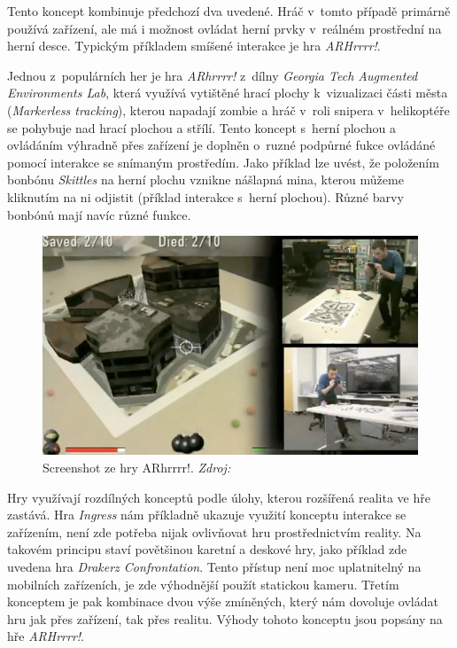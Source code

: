 \documentclass[twoside,12pt]{article}
\begin{document}
Tento koncept kombinuje předchozí dva uvedené. Hráč v~tomto případě primárně používá zařízení, ale má i možnost ovládat herní prvky v~reálném prostřední na herní desce. Typickým příkladem smíšené interakce je hra \textit{ARHrrrr!}.

% 
Jednou z~populárních her je hra \textit{ARhrrrr!} z~dílny \textit{Georgia Tech Augmented Environments Lab}, která využívá vytištěné hrací plochy k~vizualizaci části města (\textit{Markerless tracking}), kterou napadají zombie a hráč v~roli snipera v~helikoptéře se pohybuje nad hrací plochou a střílí. Tento koncept s~herní plochou a ovládáním výhradně přes zařízení je doplněn o~ruzné podpůrné fukce ovládáné pomocí interakce se snímaným prostředím. Jako příklad lze uvést, že položením bonbónu \textit{Skittles} na herní plochu vznikne nášlapná mina, kterou můžeme kliknutím na ni odjistit (příklad interakce s~herní plochou). Různé barvy bonbónů mají navíc různé funkce.

\begin{figure}[H]
    \includegraphics[width=424px, center]{images/arhrrrr.jpg}
    \caption[]{Screenshot ze hry ARhrrrr!. \textit{Zdroj: \cite{arhrrrr_screenshot}}}
    \label{arhrrrr_screenshot}
\end{figure}

Hry využívají rozdílných konceptů podle úlohy, kterou rozšířená realita ve hře zastává. Hra \textit{Ingress} nám příkladně ukazuje využití konceptu interakce se zařízením, není zde potřeba nijak ovlivňovat hru prostřednictvím reality. Na takovém principu staví povětšinou karetní a deskové hry, jako příklad zde uvedena hra \textit{Drakerz Confrontation}. Tento přístup není moc uplatnitelný na mobilních zařízeních, je zde výhodnější použít statickou kameru. Třetím konceptem je pak kombinace dvou výše zmíněných, který nám dovoluje ovládat hru jak přes zařízení, tak přes realitu. Výhody tohoto konceptu jsou popsány na hře \textit{ARHrrrr!}.
\end{document}
